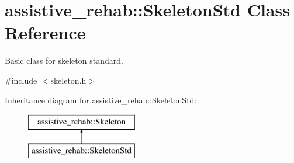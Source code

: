 \section{assistive\+\_\+rehab\+::Skeleton\+Std Class Reference}
\label{classassistive__rehab_1_1SkeletonStd}


Basic class for skeleton standard.  




{\ttfamily \#include $<$skeleton.\+h$>$}

Inheritance diagram for assistive\+\_\+rehab\+::Skeleton\+Std\+:\begin{figure}[H]
\begin{center}
\leavevmode
\includegraphics[height=2.000000cm]{classassistive__rehab_1_1SkeletonStd}
\end{center}
\end{figure}
